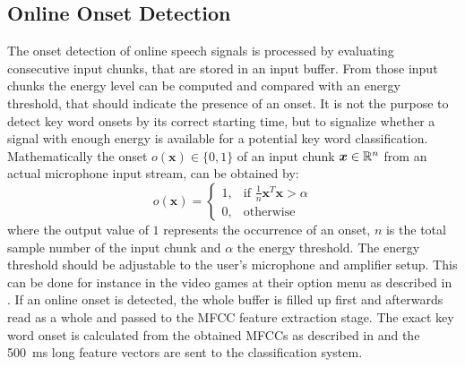 
\subsection{Online Onset Detection}\label{sec:signal_onset_online}
The onset detection of online speech signals is processed by evaluating consecutive input chunks, that are stored in an input buffer.
From those input chunks the energy level can be computed and compared with an energy threshold, that should indicate the presence of an onset.
It is not the purpose to detect key word onsets by its correct starting time, but to signalize whether a signal with enough energy is available for a potential key word classification.
Mathematically the onset $o(\bm{x}) \in \{0, 1\}$ of an input chunk $\bm{x} \in \mathbb{R}^n$ from an actual microphone input stream, can be obtained by:
\begin{equation}
  o(\bm{x}) = 
  \begin{cases}
    1, & \text{if } \frac{1}{n} \bm{x}^T \bm{x} > \alpha\\
    0, & \text{otherwise} 
  \end{cases}
\end{equation}
where the output value of $1$ represents the occurrence of an onset, $n$ is the total sample number of the input chunk and $\alpha$ the energy threshold.
The energy threshold should be adjustable to the user's microphone and amplifier setup. 
This can be done for instance in the video games at their option menu as described in .
If an online onset is detected, the whole buffer is filled up first and afterwards read as a whole and passed to the MFCC feature extraction stage.
The exact key word onset is calculated from the obtained MFCCs as described in  and the \SI{500}{\milli\second} long feature vectors are sent to the classification system.